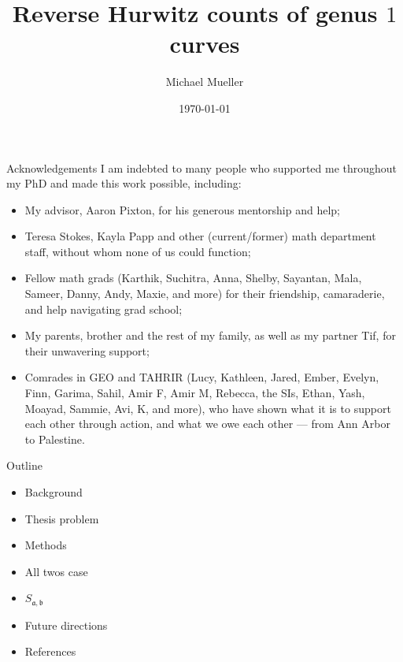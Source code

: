 \documentclass{beamer}
\title{Reverse Hurwitz counts of genus $1$ curves}
\author{Michael Mueller}
\date{\today}
\renewcommand{\a}{\mathfrak a}
\renewcommand{\b}{\mathfrak b}
\theoremstyle{definition}
\begin{document}
    \begin{frame}[plain]
        \maketitle
    \end{frame}

    \begin{frame}{Acknowledgements}
      I am indebted to many people who supported me throughout my PhD and made this work possible, including:
      \begin{itemize}
      \item My advisor, Aaron Pixton, for his generous mentorship and help;
      \item Teresa Stokes, Kayla Papp and other (current/former) math department staff, without whom none of us could function;
      \item Fellow math grads (Karthik, Suchitra, Anna, Shelby, Sayantan, Mala, Sameer, Danny, Andy, Maxie, and more) for their friendship, camaraderie, and
        help navigating grad school;
        \item My parents, brother and the rest of my family, as well as my partner Tif, for their unwavering support;
      \item Comrades in GEO and TAHRIR (Lucy, Kathleen, Jared, Ember, Evelyn, Finn, Garima, Sahil, Amir F, Amir M, Rebecca, the SIs, Ethan, Yash, Moayad, Sammie, Avi, K, and more), who
        have shown what it is to support each other through action, and what we owe each other --- from Ann Arbor to Palestine.
        \end{itemize}
    \end{frame}

    \begin{frame}{Outline}
      \begin{itemize}
      \item Background
      \item Thesis problem
      \item Methods
      \item All twos case
      \item $S_{\a,\b}$
      \item Future directions
        \item References
        \end{itemize}
    \end{frame}

\end{document}
